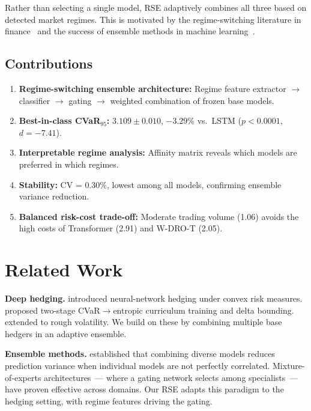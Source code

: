 \documentclass[11pt]{article}
\begin{document}
Rather than selecting a single model, RSE adaptively combines all three based on detected market regimes. This is motivated by the regime-switching literature in finance~\citep{hamilton1989new} and the success of ensemble methods in machine learning~\citep{dietterich2000ensemble}.

\subsection{Contributions}

\begin{enumerate}[noitemsep,leftmargin=*]
    \item \textbf{Regime-switching ensemble architecture:} Regime feature extractor $\to$ classifier $\to$ gating $\to$ weighted combination of frozen base models.
    \item \textbf{Best-in-class CVaR$_{95}$:} $3.109 \pm 0.010$, $-3.29\%$ vs.\ LSTM ($p < 0.0001$, $d = -7.41$).
    \item \textbf{Interpretable regime analysis:} Affinity matrix reveals which models are preferred in which regimes.
    \item \textbf{Stability:} CV = 0.30\%, lowest among all models, confirming ensemble variance reduction.
    \item \textbf{Balanced risk-cost trade-off:} Moderate trading volume (1.06) avoids the high costs of Transformer (2.91) and W-DRO-T (2.05).
\end{enumerate}

\section{Related Work}
\label{sec:related}

\textbf{Deep hedging.}
\citet{buehler2019deep} introduced neural-network hedging under convex risk measures. \citet{kozyra2019deep} proposed two-stage CVaR$\to$entropic curriculum training and delta bounding. \citet{horvath2021deep} extended to rough volatility. We build on these by combining multiple base hedgers in an adaptive ensemble.

\textbf{Ensemble methods.}
\citet{dietterich2000ensemble} established that combining diverse models reduces prediction variance when individual models are not perfectly correlated. Mixture-of-experts architectures~--- where a gating network selects among specialists~--- have proven effective across domains. Our RSE adapts this paradigm to the hedging setting, with regime features driving the gating.
\end{document}
